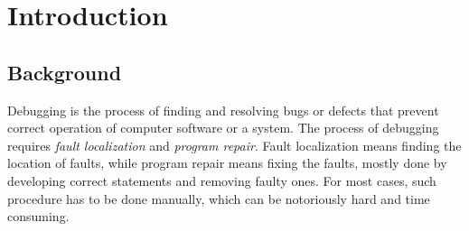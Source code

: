 \section{Introduction}
\label{section:Introduction}
\subsection{Background}
\label{section:Background}

Debugging is the process of finding and resolving bugs or defects that prevent correct operation of computer software or a system\cite{APD}.
The process of debugging requires {\it fault localization} and {\it program repair}\cite{SPBPRUS}.
Fault localization means finding the location of faults,
while program repair means fixing the faults, mostly done by developing correct statements and removing faulty ones\cite{LCoPF}.
For most cases, such procedure has to be done manually, which can be notoriously hard and time consuming.

